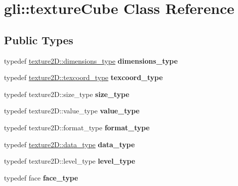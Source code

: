 \hypertarget{classgli_1_1textureCube}{\section{gli\-:\-:texture\-Cube \-Class \-Reference}
\label{classgli_1_1textureCube}
}
\subsection*{\-Public \-Types}
\begin{DoxyCompactItemize}
\item 
\hypertarget{classgli_1_1textureCube_aab5eb23c3cf2d256559c1f88435537a9}{typedef \hyperlink{structglm_1_1detail_1_1tvec2}{texture2\-D\-::dimensions\-\_\-type} {\bfseries dimensions\-\_\-type}}\label{classgli_1_1textureCube_aab5eb23c3cf2d256559c1f88435537a9}

\item 
\hypertarget{classgli_1_1textureCube_adf5d27459848ad8a777b5487a05917e3}{typedef \hyperlink{structglm_1_1detail_1_1tvec2}{texture2\-D\-::texcoord\-\_\-type} {\bfseries texcoord\-\_\-type}}\label{classgli_1_1textureCube_adf5d27459848ad8a777b5487a05917e3}

\item 
\hypertarget{classgli_1_1textureCube_afd7ea0de417ff39235db75ce034071b2}{typedef texture2\-D\-::size\-\_\-type {\bfseries size\-\_\-type}}\label{classgli_1_1textureCube_afd7ea0de417ff39235db75ce034071b2}

\item 
\hypertarget{classgli_1_1textureCube_a66c9f3795926df53afc24044eda7e665}{typedef texture2\-D\-::value\-\_\-type {\bfseries value\-\_\-type}}\label{classgli_1_1textureCube_a66c9f3795926df53afc24044eda7e665}

\item 
\hypertarget{classgli_1_1textureCube_a92806754642736281279202051293b28}{typedef texture2\-D\-::format\-\_\-type {\bfseries format\-\_\-type}}\label{classgli_1_1textureCube_a92806754642736281279202051293b28}

\item 
\hypertarget{classgli_1_1textureCube_ae60d245f59c7d0d6bc5863cff362c934}{typedef \hyperlink{classgli_1_1shared__array}{texture2\-D\-::data\-\_\-type} {\bfseries data\-\_\-type}}\label{classgli_1_1textureCube_ae60d245f59c7d0d6bc5863cff362c934}

\item 
\hypertarget{classgli_1_1textureCube_ad27cf8514a97abaa5956760c88b416c1}{typedef texture2\-D\-::level\-\_\-type {\bfseries level\-\_\-type}}\label{classgli_1_1textureCube_ad27cf8514a97abaa5956760c88b416c1}

\item 
\hypertarget{classgli_1_1textureCube_a9b673148d7ad98c585794808fe939628}{typedef face {\bfseries face\-\_\-type}}\label{classgli_1_1textureCube_a9b673148d7ad98c585794808fe939628}

\end{DoxyCompactItemize}
